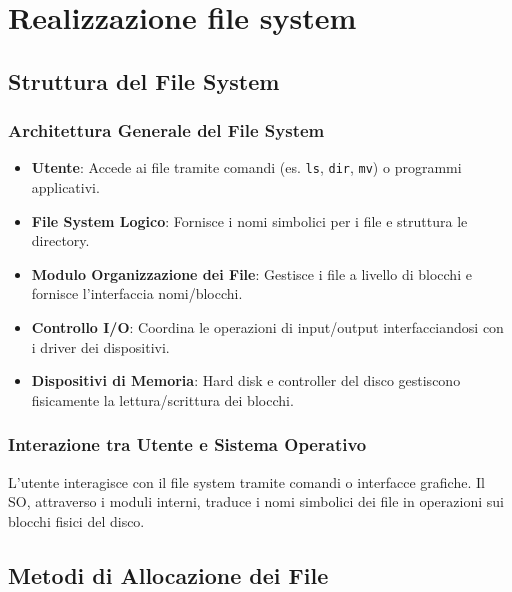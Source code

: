 \chapter{Realizzazione file system}
\section{Struttura del File System}
\subsection{Architettura Generale del File System}

\begin{itemize}
    \item \textbf{Utente}: Accede ai file tramite comandi (es. \texttt{ls}, \texttt{dir}, \texttt{mv}) o programmi applicativi.
    \item \textbf{File System Logico}: Fornisce i nomi simbolici per i file e struttura le directory.
    \item \textbf{Modulo Organizzazione dei File}: Gestisce i file a livello di blocchi e fornisce l'interfaccia nomi/blocchi.
    \item \textbf{Controllo I/O}: Coordina le operazioni di input/output interfacciandosi con i driver dei dispositivi.
    \item \textbf{Dispositivi di Memoria}: Hard disk e controller del disco gestiscono fisicamente la lettura/scrittura dei blocchi.
\end{itemize}


\subsection{Interazione tra Utente e Sistema Operativo}
L'utente interagisce con il file system tramite comandi o interfacce grafiche. Il SO, attraverso i moduli interni, traduce i nomi simbolici dei file in operazioni sui blocchi fisici del disco.

\section{Metodi di Allocazione dei File}
